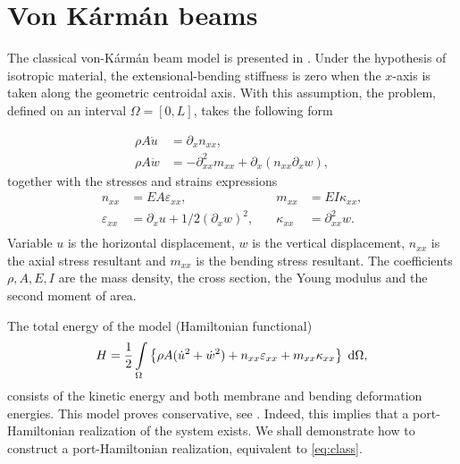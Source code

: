 \documentclass{ifacconf}
\begin{document}
\section{Von K\'arm\'an beams}\label{sec:vK_beams}


The classical von-K\'arm\'an beam model is presented in \cite[Chapter 4]{reddy2010introduction}. Under the hypothesis of isotropic material, the extensional-bending stiffness is zero when the $x$-axis is taken along the geometric centroidal axis. With this assumption, the problem, defined on an interval $\Omega = [0, L]$, takes the following form

\begin{equation}\label{eq:class}
	\begin{aligned}
		\rho A \ddot{u} &= \partial_x n_{xx}, \\
		\rho A \ddot{w} &= -\partial^2_{xx} m_{xx} + \partial_x(n_{xx} \partial_x w),
	\end{aligned} 
\end{equation}
together with the stresses and strains expressions
\begin{equation}
	\begin{aligned}
		n_{xx} &= EA \varepsilon_{xx}, \\
		\varepsilon_{xx} &= \partial_x u + 1/2 (\partial_x w)^2, \\
	\end{aligned} \quad
	\begin{aligned}
		m_{xx} &= EI \kappa_{xx}, \\
		\kappa_{xx} &=\partial^2_{xx} w. \\
	\end{aligned} 
\end{equation}
Variable $u$ is the horizontal displacement, $w$ is the vertical displacement, $n_{xx}$ is the axial stress resultant and $m_{xx}$ is the bending stress resultant. The coefficients $\rho, A, E, I$ are the mass density, the cross section, the Young modulus and the second moment of area.

The total energy of the model (Hamiltonian functional)
\begin{equation}
	H = \frac{1}{2} \int_{\Omega}\left\{\rho A (\dot{u}^2 + \dot{w}^2) + n_{xx} \varepsilon_{xx} + m_{xx} \kappa_{xx} \right\} \d\Omega,
\end{equation}
consists of the kinetic energy and both membrane and bending deformation energies.
This model proves conservative, see \cite{bilbao2015conservative}. Indeed, this implies that a port-Hamiltonian realization of the system exists. We shall demonstrate how to construct a port-Hamiltonian realization, equivalent to \eqref{eq:class}.
\end{document}

